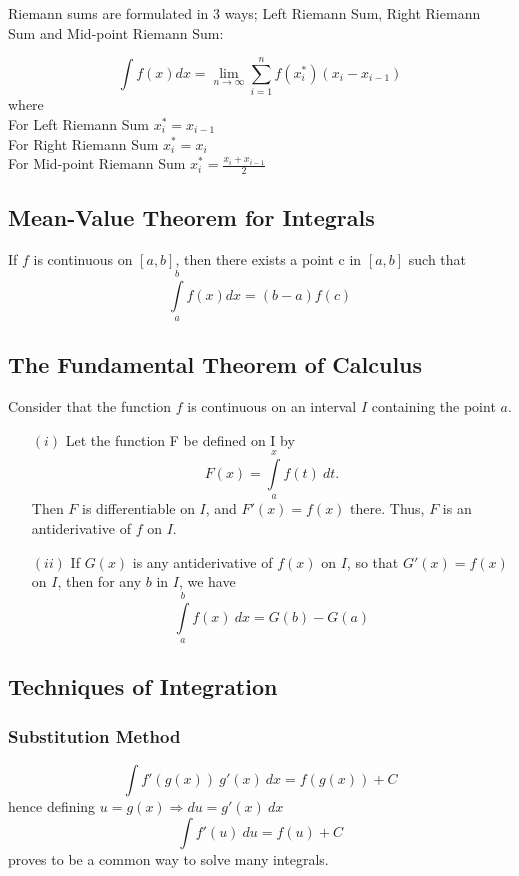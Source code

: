 \documentclass[12pt]{article}
\begin{document}
Riemann sums are formulated in 3 ways; Left Riemann Sum, Right Riemann Sum and Mid-point Riemann Sum:

$$\int f(x)dx = \lim \limits_{n \to \infty} \sum \limits_{i=1}^{n} f(x_i^*)(x_i-x_{i-1})$$ where \\For Left Riemann Sum $x_i^*=x_{i-1}$\\For Right Riemann Sum $x_i^*=x_{i}$\\For Mid-point Riemann Sum $\displaystyle{x_i^*=\frac{x_i+x_{i-1}}{2}}$
\subsection{Mean-Value Theorem for Integrals}
If $f$ is continuous on $[a,b]$, then there exists a point c in $[a,b]$ such that $$\int \limits_a^b f(x)dx=(b-a)f(c)$$
\newpage
\subsection{The Fundamental Theorem of Calculus}
Consider that the function $f$ is continuous on an interval $I$ containing the point $a$.
\begin{itemize}
\item[$(i)$] Let the function F be defined on I by $$F(x)=\int \limits_a^x f(t)\ dt.$$ Then $F$ is differentiable on $I$, and $F'(x)=f(x)$ there. Thus, $F$ is an antiderivative of $f$ on $I$.
\item[$(ii)$] If $G(x)$ is any antiderivative of $f(x)$ on $I$, so that $G'(x) = f(x)$ on $I$, then for any $b$ in $I$, we have $$\int \limits_a^b f(x)\ dx=G(b)-G(a)$$
\end{itemize}
\subsection{Techniques of Integration}
\subsubsection{Substitution Method}
$$\int f'(g(x))\ g'(x)\ dx=f(g(x))+C$$ hence defining $u=g(x) \Rightarrow du=g'(x)\ dx$ $$\int f'(u)\ du=f(u) +C$$ proves to be a common way to solve many integrals.
\end{document}

